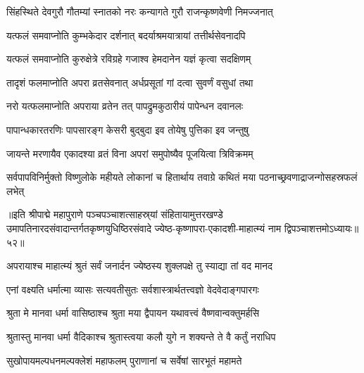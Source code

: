 \twolineshloka
{सिंहस्थिते देवगुरौ गौतम्यां स्नातको नरः}
{कन्यागते गुरौ राजन्कृष्णवेणी निमज्जनात्}%

\twolineshloka
{यत्फलं समवाप्नोति कुम्भकेदार दर्शनात्}
{बदर्याश्रमयात्रायां तत्तीर्थसेवनादपि}%

\twolineshloka
{यत्फलं समवाप्नोति कुरुक्षेत्रे रविग्रहे}
{गजाश्व हेमदानेन यज्ञं कृत्वा सदक्षिणम्}%

\twolineshloka
{तादृशं फलमाप्नोति अपरा व्रतसेवनात्}
{अर्धप्रसूतां गां दत्वा सुवर्णं वसुधां तथा}%

\twolineshloka
{नरो यत्फलमाप्नोति अपराया व्रतेन तत्}
{पापद्रुमकुठारीयं पापेन्धन दवानलः}%

\twolineshloka
{पापान्धकारतरणिः पापसारङ्ग केसरी}
{बुद्बुदा इव तोयेषु पुत्तिका इव जन्तुषु}%

\twolineshloka
{जायन्ते मरणायैव एकादश्या व्रतं विना}
{अपरां समुपोष्यैव पूजयित्वा त्रिविक्रमम्}%

\threelineshloka
{सर्वपापविनिर्मुक्तो विष्णुलोके महीयते}
{लोकानां च हितार्थाय तवाग्रे कथितं मया}
{पठनाच्छ्रवणाद्राजन्गोसहस्रफलं लभेत्}%

॥इति श्रीपाद्मे महापुराणे पञ्चपञ्चाशत्साहस्र्यां संहितायामुत्तरखण्डे उमापतिनारदसंवादान्तर्गतकृष्णयुधिष्ठिरसंवादे ज्येष्ठ-कृष्णापरा-एकादशी-माहात्म्यं नाम द्विपञ्चाशत्तमोऽध्यायः॥५२॥


\hyperref[sec:ekadashi_mahatmyam_padma_puranam]{\closesub}
\clearpage

\label{sec:padma-jyeshtha-shukla-nirjala}



\twolineshloka
{अपरायाश्च माहात्म्यं श्रुतं सर्वं जनार्दन}
{ज्येष्ठस्य शुक्लपक्षे तु स्याद्या तां वद मानद}%


\twolineshloka
{एनां वक्ष्यति धर्मात्मा व्यासः सत्यवतीसुतः}
{सर्वशास्त्रार्थतत्त्वज्ञो वेदवेदाङ्गपारगः}%


\twolineshloka
{श्रुता मे मानवा धर्मा वासिष्ठाश्च श्रुता मया}
{द्वैपायन यथावत्त्वं वैष्णवान्वक्तुमर्हसि}%


\twolineshloka
{श्रुतास्तु मानवा धर्मा वैदिकाश्च श्रुतास्त्वया}
{कलौ युगे न शक्यन्ते ते वै कर्तुं नराधिप}%

\twolineshloka
{सुखोपायमल्पधनमल्पक्लेशं महाफलम्}
{पुराणानां च सर्वेषां सारभूतं महामते}%

